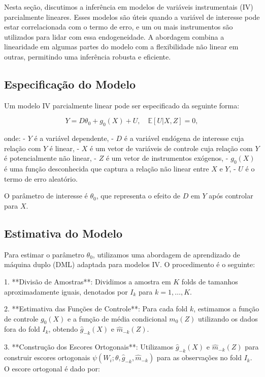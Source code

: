 \documentclass[a4paper,12pt]{article}[abntex2]
\begin{document}
Nesta seção, discutimos a inferência em modelos de variáveis instrumentais (IV) parcialmente lineares. Esses modelos são úteis quando a variável de interesse pode estar correlacionada com o termo de erro, e um ou mais instrumentos são utilizados para lidar com essa endogeneidade. A abordagem combina a linearidade em algumas partes do modelo com a flexibilidade não linear em outras, permitindo uma inferência robusta e eficiente.

\subsection*{Especificação do Modelo}

Um modelo IV parcialmente linear pode ser especificado da seguinte forma:

\[
Y = D\theta_0 + g_0(X) + U, \quad \mathbb{E}[U | X, Z] = 0,
\]

onde:
- $Y$ é a variável dependente,
- $D$ é a variável endógena de interesse cuja relação com $Y$ é linear,
- $X$ é um vetor de variáveis de controle cuja relação com $Y$ é potencialmente não linear,
- $Z$ é um vetor de instrumentos exógenos,
- $g_0(X)$ é uma função desconhecida que captura a relação não linear entre $X$ e $Y$,
- $U$ é o termo de erro aleatório.

O parâmetro de interesse é $\theta_0$, que representa o efeito de $D$ em $Y$ após controlar para $X$.

\subsection*{Estimativa do Modelo}

Para estimar o parâmetro $\theta_0$, utilizamos uma abordagem de aprendizado de máquina duplo (DML) adaptada para modelos IV. O procedimento é o seguinte:

1. **Divisão de Amostras**: Dividimos a amostra em $K$ folds de tamanhos aproximadamente iguais, denotados por $I_k$ para $k = 1, \ldots, K$.

2. **Estimativa das Funções de Controle**: Para cada fold $k$, estimamos a função de controle $g_0(X)$ e a função de média condicional $m_0(Z)$ utilizando os dados fora do fold $I_k$, obtendo $\hat{g}_{-k}(X)$ e $\hat{m}_{-k}(Z)$.

3. **Construção dos Escores Ortogonais**: Utilizamos $\hat{g}_{-k}(X)$ e $\hat{m}_{-k}(Z)$ para construir escores ortogonais $\psi(W_i; \theta, \hat{g}_{-k}, \hat{m}_{-k})$ para as observações no fold $I_k$. O escore ortogonal é dado por:
\end{document}

